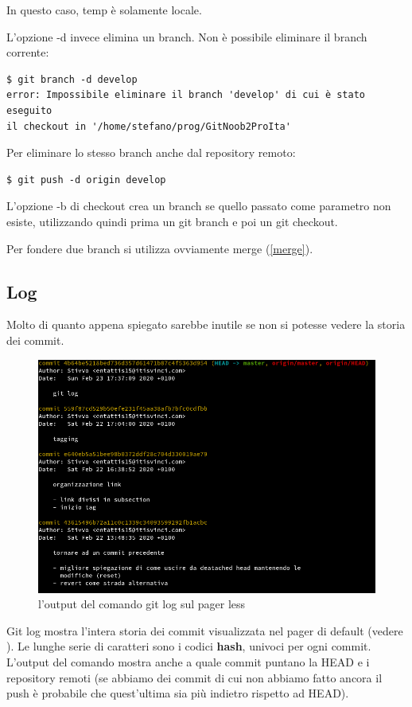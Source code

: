 \documentclass{article}
\begin{document}
In questo caso, temp è solamente locale.

L'opzione -d invece elimina un branch. Non è possibile eliminare il branch corrente:

\begin{verbatim}
$ git branch -d develop
error: Impossibile eliminare il branch 'develop' di cui è stato eseguito 
il checkout in '/home/stefano/prog/GitNoob2ProIta'
\end{verbatim}

Per eliminare lo stesso branch anche dal repository remoto:

\begin{verbatim}
$ git push -d origin develop
\end{verbatim}

L'opzione -b di checkout crea un branch se quello passato come parametro non
esiste, utilizzando quindi prima un git branch e poi un git checkout.

Per fondere due branch si utilizza ovviamente merge (\ref{merge}).

\subsection{Log\label{log}}
Molto di quanto appena spiegato sarebbe inutile se non si potesse vedere la
storia dei commit.

\begin{figure}
\includegraphics[width=6in]{img/logOutput.png}
\centering
\caption{l'output del comando git log sul pager less}
\end{figure}

Git log mostra l'intera storia dei commit visualizzata nel pager di default
(vedere ).
Le lunghe serie di caratteri sono i codici \textbf{hash}, univoci per ogni
commit. L'output del comando mostra anche a quale commit puntano la HEAD e i
repository remoti (se abbiamo dei commit di cui non abbiamo fatto ancora il push
è probabile che quest'ultima sia più indietro rispetto ad HEAD).
\end{document}
